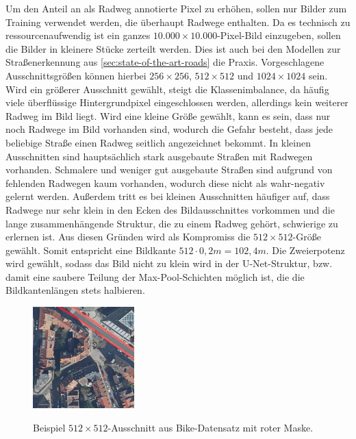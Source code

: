 Um den Anteil an als Radweg annotierte Pixel zu erhöhen, sollen nur Bilder zum Training verwendet werden,
die überhaupt Radwege enthalten. Da es technisch zu ressourcenaufwendig ist ein ganzes 
$10.000 \times 10.000$-Pixel-Bild einzugeben, sollen die Bilder in kleinere Stücke zerteilt werden. 
Dies ist auch bei den Modellen zur Straßenerkennung aus \autoref{sec:state-of-the-art-roads} die Praxis. 
Vorgeschlagene Ausschnittsgrößen können hierbei $256\times 256$, $512\times 512$ und $1024 \times 1024$ sein. 
Wird ein größerer Ausschnitt gewählt, steigt die Klassenimbalance, da häufig viele überflüssige 
Hintergrundpixel eingeschlossen werden, allerdings kein weiterer Radweg im Bild liegt. 
Wird eine kleine Größe gewählt, kann es sein, dass nur noch Radwege im Bild vorhanden sind, 
wodurch die Gefahr besteht, dass jede beliebige Straße einen Radweg seitlich angezeichnet bekommt. 
In kleinen Ausschnitten sind hauptsächlich stark ausgebaute Straßen mit Radwegen vorhanden. 
Schmalere und weniger gut ausgebaute Straßen sind aufgrund von fehlenden Radwegen kaum vorhanden, wodurch diese nicht als wahr-negativ gelernt werden.  
Außerdem tritt es bei kleinen Ausschnitten häufiger auf, dass Radwege nur sehr klein in den Ecken des Bildausschnittes
vorkommen und die lange zusammenhängende Struktur, die zu einem Radweg gehört, schwierige zu erlernen ist. 
Aus diesen Gründen wird als Kompromiss die $512 \times 512$-Größe gewählt. Somit entspricht eine Bildkante 
$512 \cdot 0,2m = 102,4m$. Die Zweierpotenz wird gewählt, 
sodass das Bild nicht zu klein wird in der U-Net-Struktur, bzw. damit eine saubere Teilung der 
Max-Pool-Schichten möglich ist, die die Bildkantenlängen stets halbieren. 

\begin{figure}
	\centering
	\vspace{-30pt} %
	\includegraphics[width=0.35\textwidth]{Bilder/cut-example.jpg}
	\vspace{-10pt}
	\caption[Beispiel $512\times 512$-Ausschnitt aus Bike-Datensatz.]{\unskip}
	Beispiel $512\times 512$-Ausschnitt aus Bike-Datensatz mit roter Maske.
	\label{fig:cut-example}
\end{figure}

